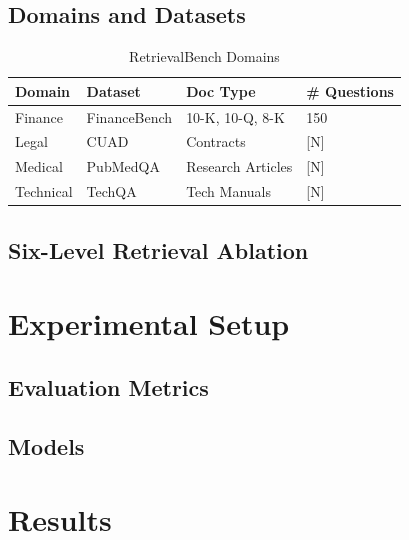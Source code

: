 \documentclass{article}
\begin{document}
\subsection{Domains and Datasets}
\begin{table}[h!]
\centering
\caption{RetrievalBench Domains}
\begin{tabular}{llll}
\toprule
\textbf{Domain} & \textbf{Dataset} & \textbf{Doc Type} & \textbf{\# Questions} \\
\midrule
Finance & FinanceBench & 10-K, 10-Q, 8-K & 150 \\
Legal & CUAD & Contracts & [N] \\
Medical & PubMedQA & Research Articles & [N] \\
Technical & TechQA & Tech Manuals & [N] \\
\bottomrule
\end{tabular}
\end{table}

\subsection{Six-Level Retrieval Ablation}

\section{Experimental Setup}
\subsection{Evaluation Metrics}
\subsection{Models}

\section{Results}
\end{document}
